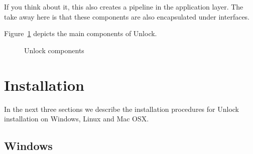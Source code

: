 \documentclass[11pt]{article}
\begin{document}
If you think about it, this also creates a pipeline in the application layer.  The take away here is that these
components are also encapsulated under interfaces.

Figure~\ref{bci-pipeline-fig} depicts the main components of Unlock.

\begin{figure}[]
\caption{\label{bci-pipeline-fig}  Unlock components}
\end{figure}



\section{Installation}

In the next three sections we describe the installation procedures for Unlock installation on Windows, Linux and Mac OSX.  

\subsection{Windows}
\end{document}
